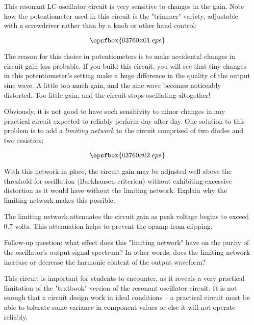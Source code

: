 

This resonant LC oscillator circuit is very sensitive to changes in the gain.  Note how the potentiometer used in this circuit is the "trimmer" variety, adjustable with a screwdriver rather than by a knob or other hand control:

$$\epsfbox{03760x01.eps}$$

The reason for this choice in potentiometers is to make accidental changes in circuit gain less probable.  If you build this circuit, you will see that tiny changes in this potentiometer's setting make a huge difference in the quality of the output sine wave.  A little too much gain, and the sine wave becomes noticeably distorted.  Too little gain, and the circuit stops oscillating altogether!

Obviously, it is not good to have such sensitivity to minor changes in any practical circuit expected to reliably perform day after day.  One solution to this problem is to add a {\it limiting network} to the circuit comprised of two diodes and two resistors:

$$\epsfbox{03760x02.eps}$$

With this network in place, the circuit gain may be adjusted well above the threshold for oscillation (Barkhausen criterion) without exhibiting excessive distortion as it would have without the limiting network.  Explain why the limiting network makes this possible.







The limiting network attenuates the circuit gain as peak voltage begins to exceed 0.7 volts.  This attenuation helps to prevent the opamp from clipping.

\vskip 10pt

Follow-up question: what effect does this "limiting network" have on the purity of the oscillator's output signal spectrum?  In other words, does the limiting network increase or decrease the harmonic content of the output waveform?







This circuit is important for students to encounter, as it reveals a very practical limitation of the "textbook" version of the resonant oscillator circuit.  It is not enough that a circuit design work in ideal conditions -- a practical circuit must be able to tolerate some variance in component values or else it will not operate reliably.





